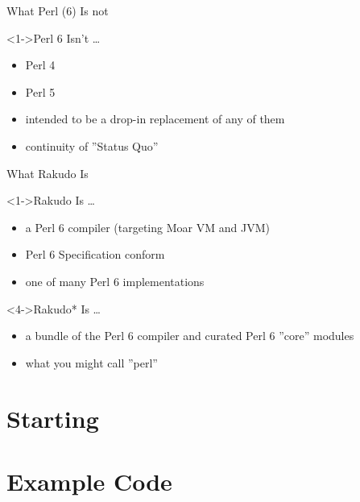 \documentclass[ngerman,xcolor={table,dvipsnames},smaller,compress,hyperref={bookmarks,colorlinks}]{beamer}%
\begin{document}
\begin{frame}[fragile]{What Perl (6) Is not}
\begin{block}<1->{Perl 6 Isn't \ldots}
\begin{itemize}
\item<1-> Perl 4
\item<2-> Perl 5
\item<3-> intended to be a drop-in replacement of any of them
\item<4-> continuity of ''Status Quo''
\end{itemize}
\end{block}
\end{frame}

\begin{frame}[fragile]{What Rakudo Is}
\begin{block}<1->{Rakudo Is \ldots}
\begin{itemize}
\item<1-> a Perl 6 compiler (targeting Moar VM and JVM)
\item<2-> Perl 6 Specification conform
\item<3-> one of many Perl 6 implementations
\end{itemize}
\end{block}

\begin{block}<4->{Rakudo* Is \ldots}
\begin{itemize}
\item<4-> a bundle of the Perl 6 compiler and curated Perl 6 ''core'' modules
\item<5-> what you might call ''perl''
\end{itemize}
\end{block}
\end{frame}

\section{Starting}



\section{Example Code}







\end{document}
